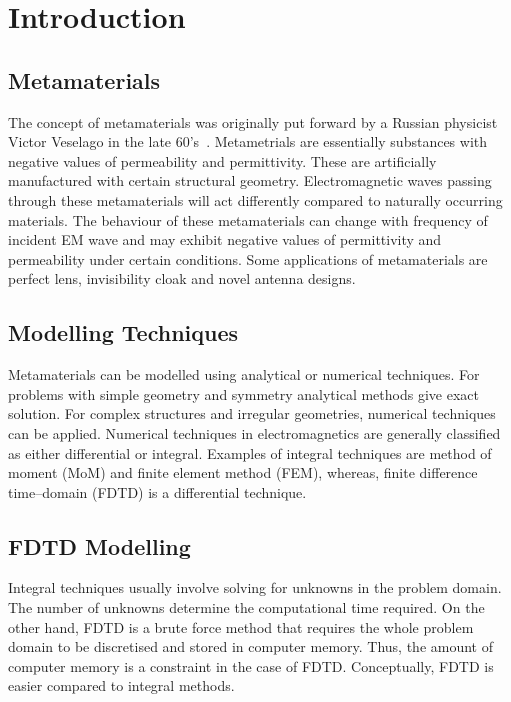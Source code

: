 \chapter{Introduction}
\section{Metamaterials}
The concept of metamaterials was originally put forward by a Russian physicist Victor Veselago in the late 60's~\cite{Newelectronics-Metamaterial}. Metametrials are essentially substances with negative values of permeability and permittivity. These are artificially manufactured with certain structural geometry. Electromagnetic waves passing through these metamaterials will act differently compared to naturally occurring materials. The behaviour of these metamaterials can change with frequency of incident EM wave and may exhibit negative values of permittivity and permeability under certain conditions. Some applications of metamaterials are perfect lens, invisibility cloak and novel antenna designs.
\section{Modelling Techniques}
Metamaterials can be modelled using analytical or numerical techniques. For problems with simple geometry and symmetry analytical methods give exact solution. For complex structures and irregular geometries, numerical techniques can be applied. Numerical techniques in electromagnetics are generally classified as either differential or integral. Examples of integral techniques are method of moment (MoM) and finite element method (FEM), whereas, finite difference time--domain (FDTD) is a differential technique.
\section{FDTD Modelling}
Integral techniques usually involve solving for unknowns in the problem domain. The number of unknowns determine the computational time required. On the other hand, FDTD is a brute force method that requires the whole problem domain to be discretised and stored in computer memory. Thus, the amount of computer memory is a constraint in the case of FDTD. Conceptually, FDTD is easier compared to integral methods.
